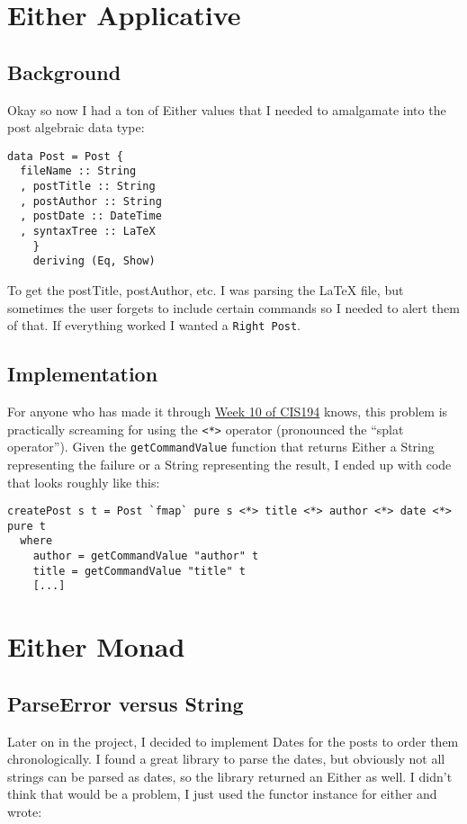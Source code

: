 \documentclass[12pt]{article}
\newcommand{\resourcepath}{../resources/abstraction-progression-blatex/}
\begin{document}
\section{Either Applicative}
  \subsection{Background}
    Okay so now I had a ton of Either values that I needed to amalgamate into the post algebraic data type:
    \begin{verbatim}
data Post = Post {
  fileName :: String
  , postTitle :: String
  , postAuthor :: String
  , postDate :: DateTime
  , syntaxTree :: LaTeX
    }
    deriving (Eq, Show)
    \end{verbatim}

    To get the postTitle, postAuthor, etc. I was parsing the LaTeX file, but sometimes the user forgets to include certain commands so I needed to alert them of that. If everything worked I wanted a \texttt{Right Post}.


  \subsection{Implementation}

  For anyone who has made it through \href{http://www.seas.upenn.edu/~cis194/spring13/lectures/10-applicative.html}{Week 10 of CIS194} knows, this problem is practically screaming for using the \texttt{<*>} operator (pronounced the ``splat operator''). Given the \texttt{getCommandValue} function that returns Either a String representing the failure or a String representing the result, I ended up with code that looks roughly like this:

  \begin{verbatim}
createPost s t = Post `fmap` pure s <*> title <*> author <*> date <*> pure t
  where 
    author = getCommandValue "author" t
    title = getCommandValue "title" t
    [...]
  \end{verbatim}

\section{Either Monad}
  \subsection{ParseError versus String}
    Later on in the project, I decided to implement Dates for the posts to order them chronologically. I found a great library to parse the dates, but obviously not all strings can be parsed as dates, so the library returned an Either as well. I didn't think that would be a problem, I just used the functor instance for either and wrote:
\end{document}
